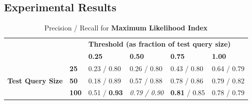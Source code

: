 \documentclass[11pt]{IEEEtran}
\begin{document}
\subsection{Experimental Results}
\begin{table}[]
\centering
\caption{Precision / Recall for \textbf{Maximum Likelihood Index}}
\label{ml}
\begin{tabular}{ll|llll}
\cline{3-6}
                                                       &              & \multicolumn{4}{l|}{\textbf{Threshold (as fraction of test query size)}}                                                                          \\ \cline{3-6} 
\textbf{}                                              &              & \multicolumn{1}{l|}{\textbf{0.25}} & \multicolumn{1}{l|}{\textbf{0.50}} & \multicolumn{1}{l|}{\textbf{0.75}} & \multicolumn{1}{l|}{\textbf{1.00}} \\ \hline
\multicolumn{1}{|l|}{\multirow{3}{*}{\textbf{Test Query Size}}} & \textbf{25}  & 0.23 / 0.80                         & 0.26 / 0.80                         & 0.43 / 0.80                        & 0.64 / 0.79                        \\ \cline{2-2}
\multicolumn{1}{|l|}{}                                 & \textbf{50}  & 0.18 / 0.89                        & 0.57 / 0.88                         & 0.78 / 0.86                         & 0.79 / 0.82                        \\ \cline{2-2}
\multicolumn{1}{|l|}{}                                 & \textbf{100} & 0.51 / \textbf{0.93}                          & \emph{0.79 / 0.90}                      & \textbf{0.81} / 0.85                         & 0.78 / 0.79                          \\ \cline{1-2}
\end{tabular}
\end{table}
\end{document}
